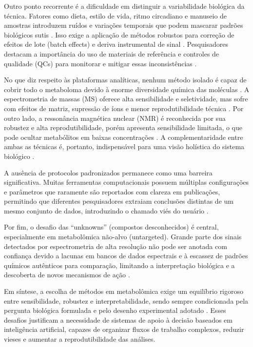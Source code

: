 Outro ponto recorrente é a dificuldade em distinguir a variabilidade biológica da técnica. Fatores como dieta, estilo de vida, ritmo circadiano e manuseio de amostras introduzem ruídos e variações temporais que podem mascarar padrões biológicos sutis \cite{datanor,picone2026integrating}. Isso exige a aplicação de métodos robustos para correção de efeitos de lote (batch effects) e deriva instrumental de sinal \cite{fan2019systematic}. Pesquisadores destacam a importância do uso de materiais de referência e controles de qualidade (QCs) para monitorar e mitigar essas inconsistências \cite{datanor}.

No que diz respeito às plataformas analíticas, nenhum método isolado é capaz de cobrir todo o metaboloma devido à enorme diversidade química das moléculas \cite{wiedmer2013selection}. A espectrometria de massas (MS) oferece alta sensibilidade e seletividade, mas sofre com efeitos de matriz, supressão de íons e menor reprodutibilidade técnica \cite{elmsjo2018method}. Por outro lado, a ressonância magnética nuclear (NMR) é reconhecida por sua robustez e alta reprodutibilidade, porém apresenta sensibilidade limitada, o que pode ocultar metabólitos em baixas concentrações \cite{mayonu2026evaluation}. A complementaridade entre ambas as técnicas é, portanto, indispensável para uma visão holística do sistema biológico \cite{picone2026integrating}.

A ausência de protocolos padronizados permanece como uma barreira significativa. Muitas ferramentas computacionais possuem múltiplas configurações e parâmetros que raramente são reportados com clareza em publicações, permitindo que diferentes pesquisadores extraiam conclusões distintas de um mesmo conjunto de dados, introduzindo o chamado viés do usuário \cite{misra2016updates}.

Por fim, o desafio das “unknowns” (compostos desconhecidos) é central, especialmente em metabolômica não-alvo (untargeted). Grande parte dos sinais detectados por espectrometria de alta resolução não pode ser anotada com confiança devido a lacunas em bancos de dados espectrais e à escassez de padrões químicos autênticos para comparação, limitando a interpretação biológica e a descoberta de novos mecanismos de ação \cite{picone2026integrating}.

Em síntese, a escolha de métodos em metabolômica exige um equilíbrio rigoroso entre sensibilidade, robustez e interpretabilidade, sendo sempre condicionada pela pergunta biológica formulada e pelo desenho experimental adotado \cite{wiedmer2013selection}. Esses desafios justificam a necessidade de sistemas de apoio à decisão baseados em inteligência artificial, capazes de organizar fluxos de trabalho complexos, reduzir vieses e aumentar a reprodutibilidade das análises.

